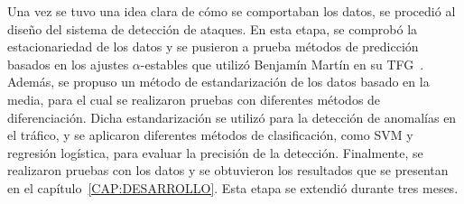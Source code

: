 Una vez se tuvo una idea clara de cómo se comportaban los datos, se procedió al diseño del sistema de detección de ataques. En esta etapa, se comprobó la estacionariedad de los datos y se pusieron a prueba métodos de predicción basados en los ajustes $\alpha$-estables que utilizó Benjamín Martín en su \ac{TFG}~\cite{benjamin2021}. Además, se propuso un método de estandarización de los datos basado en la media, para el cual se realizaron pruebas con diferentes métodos de diferenciación. Dicha estandarización se utilizó para la detección de anomalías en el tráfico, y se aplicaron diferentes métodos de clasificación, como \ac{SVM} y regresión logística, para evaluar la precisión de la detección.
Finalmente, se realizaron pruebas con los datos y se obtuvieron los resultados que se presentan en el capítulo~\ref{CAP:DESARROLLO}.
Esta etapa se extendió durante tres meses.
